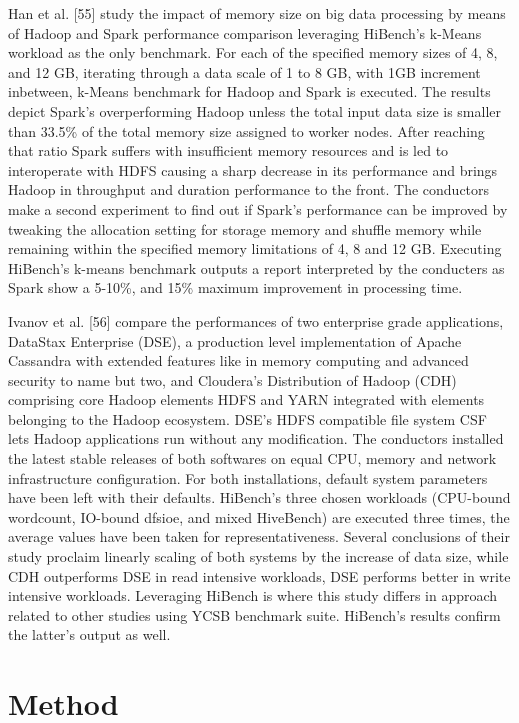 \documentclass[review]{elsarticle}
\begin{document}
Han et al. [55] study the impact of memory size on big data processing by means of Hadoop and Spark performance comparison leveraging HiBench’s k-Means workload as the only benchmark. For each of the specified memory sizes of 4, 8, and 12 GB, iterating through a data scale of 1 to 8 GB, with 1GB increment inbetween, k-Means benchmark for Hadoop and Spark is executed. The results depict Spark’s overperforming Hadoop unless the total input data size is smaller than 33.5\% of the total memory size assigned to worker nodes. After reaching that ratio Spark suffers with insufficient memory resources and is led to interoperate with HDFS causing a sharp decrease in its performance and brings Hadoop in throughput and duration performance to the front. The conductors make a second experiment to find out if Spark’s performance can be improved by tweaking the allocation setting for storage memory and shuffle memory while remaining within the specified memory limitations of 4, 8 and 12 GB. Executing HiBench’s k-means benchmark outputs a report interpreted by the conducters as Spark show a 5-10\%, and 15\% maximum improvement in processing time.

Ivanov et al. [56] compare the performances of two enterprise grade applications, DataStax Enterprise (DSE), a production level implementation of Apache Cassandra with extended features like in memory computing and advanced security to name but two, and Cloudera’s Distribution of Hadoop (CDH) comprising core Hadoop elements HDFS and YARN integrated with elements belonging to the Hadoop ecosystem. DSE’s HDFS compatible file system CSF lets Hadoop applications run without any modification. The conductors installed the latest stable releases of both softwares on equal CPU, memory and network infrastructure configuration. For both installations, default system parameters have been left with their defaults. HiBench’s three chosen workloads (CPU-bound wordcount, IO-bound dfsioe, and mixed HiveBench) are executed three times, the average values have been taken for representativeness. Several conclusions of their study proclaim linearly scaling of both systems by the increase of data size, while CDH outperforms DSE in read intensive workloads, DSE performs better in write intensive workloads. Leveraging HiBench is where this study differs in approach related to other studies using YCSB benchmark suite. HiBench’s results confirm the latter’s output as well.




\section{Method}
\end{document}
